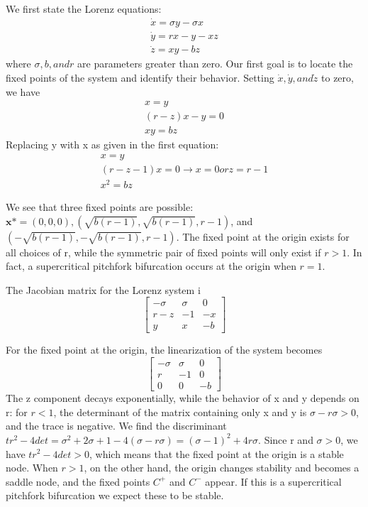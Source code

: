 \documentclass{report}
\begin{document}
We first state the Lorenz equations:
\begin{align*}
   \dot{x} = \sigma y - \sigma x \\
   \dot{y} = rx - y - xz \\
   \dot{z} = xy - bz
\end{align*}
where \( \sigma , b, and r \) are parameters greater than zero. Our first goal is to
locate the fixed points of the system and identify their behavior. Setting
\( \dot{x}, \dot{y}, and \dot{z}\) to zero, we have
\begin{align*}
   x = y \\
   (r-z)x - y = 0 \\
   xy = bz
\end{align*}
Replacing y with x as given in the first equation:
\begin{align*}
  x = y \\
  (r-z-1)x = 0 \longrightarrow x = 0 or z = r-1 \\
  x^2 = bz
\end{align*}

We see that three fixed points are possible: \( \boldsymbol{x\mbox{*}} = (0,0,0),(\sqrt{b(r-1)},\sqrt{b(r-1)},r-1)\), and \((-\sqrt{b(r-1)},-\sqrt{b(r-1)},r-1)\).
The fixed point at the origin exists for all choices of r, while the symmetric 
pair of fixed points will only exist if \(r > 1\). In fact, a supercritical 
pitchfork bifurcation occurs at the origin when \( r = 1 \).

The Jacobian matrix for the Lorenz system i
\[
\begin{bmatrix}
   -\sigma & \sigma & 0 \\
   r - z & -1 & -x \\
   y & x & -b
\end{bmatrix}
\]

For the fixed point at the origin, the linearization of the system becomes
\[
\begin{bmatrix}
   -\sigma & \sigma & 0 \\
   r & -1 & 0 \\
   0 & 0 & -b

\end{bmatrix}
\]
The z component decays exponentially, while the behavior of x and y depends on 
r: for \( r < 1\), the determinant of the matrix containing only x and y is
\(\sigma - r\sigma > 0\), and the trace is negative. We find the discriminant 
\(tr^2 - 4det = \sigma^2 +2\sigma + 1 -4(\sigma -r\sigma) = (\sigma - 1)^2 +
  4r\sigma\). Since r and \(\sigma > 0 \), we have \(tr^2 -4det > 0\), which 
means that the fixed point at the origin is a stable node. When \(r > 1\), on 
the other hand, the origin changes stability and becomes a saddle node, and the
fixed points \(C^+\) and \(C^-\) appear. If this is a supercritical pitchfork
bifurcation we expect these to be stable.
\end{document}
